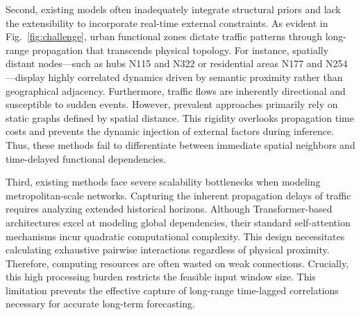 \documentclass[5p,times,authoryear]{elsarticle}
\begin{document}
Second, existing models often inadequately integrate structural priors and lack the extensibility to incorporate real-time external constraints. As evident in Fig.~\ref{fig:challenge}, urban functional zones dictate traffic patterns through long-range propagation that transcends physical topology. For instance, spatially distant nodes---such as hubs N115 and N322 or residential areas N177 and N254---display highly correlated dynamics driven by semantic proximity rather than geographical adjacency. Furthermore, traffic flows are inherently directional and susceptible to sudden events. However, prevalent approaches primarily rely on static graphs defined by spatial distance. This rigidity overlooks propagation time costs and prevents the dynamic injection of external factors during inference. Thus, these methods fail to differentiate between immediate spatial neighbors and time-delayed functional dependencies.


Third, existing methods face severe scalability bottlenecks when modeling metropolitan-scale networks. Capturing the inherent propagation delays of traffic requires analyzing extended historical horizons. Although Transformer-based architectures excel at modeling global dependencies, their standard self-attention mechanisms incur quadratic computational complexity. This design necessitates calculating exhaustive pairwise interactions regardless of physical proximity. Therefore, computing resources are often wasted on weak connections. Crucially, this high processing burden restricts the feasible input window size. This limitation prevents the effective capture of long-range time-lagged correlations necessary for accurate long-term forecasting.
\end{document}
